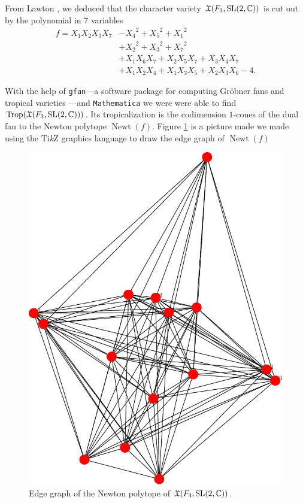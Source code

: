 \documentclass[11pt]{article}
\DeclareMathOperator{\Newt}{Newt}
\begin{document}
From Lawton \cite{}, we deduced that the character variety
$\mathfrak{X}(F_3,\mathrm{SL}(2,\mathbb{C}))$ is cut out by the polynomial in $7$ variables
\begin{equation}
  \label{eq:f3-sl2c}
  \begin{aligned}
    f=X_1X_2X_3X_7&-{X_4}^2+{X_5}^2+{X_1}^2\\
    &+{X_2}^2+{X_3}^2+{X_7}^2\\
    &+X_1X_6X_7+X_2X_5X_7+X_3X_4X_7\\
    &+X_1X_2X_4+X_1X_3X_5+X_2X_3X_6-4.
  \end{aligned}
\end{equation}

With the help of \texttt{gfan}---a software package for computing Gröbner
fans and tropical varieties \cite{gfan}---and \texttt{Mathematica} we were
were able to find $\operatorname{Trop}(\mathfrak{X}(F_3,\mathrm{SL}(2,\mathbb{C})))$. Its tropicalization is
the codimension $1$-cones of the dual fan to the Newton polytope
$\Newt(f)$. Figure \ref{fig:f3-sl2c} is a picture made we made using the
Ti\textit{k}Z graphics language to draw the edge graph of $\Newt(f)$

\begin{figure}[h]
  \centering
  \includegraphics[scale=.25]{smallgraph}
  \caption{Edge graph of the Newton polytope of $\mathfrak{X}(F_3,\mathrm{SL}(2,\mathbb{C}))$.}
\label{fig:f3-sl2c}
\end{figure}
\end{document}
